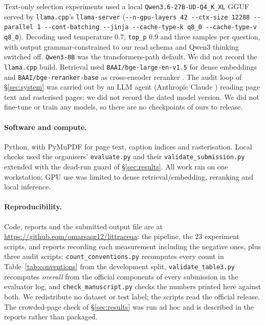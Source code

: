 \documentclass[11pt]{article}
\newcommand{\bk}{\allowbreak}
\begin{document}
Text-only selection experiments used a local
\texttt{Qwen3.6-\bk{}27B-\bk{}UD-\bk{}Q4\_\bk{}K\_\bk{}XL} GGUF served by \texttt{llama.cpp}'s
\texttt{llama-\bk{}server} (\texttt{-{}-n-\bk{}gpu-\bk{}layers 42 -{}-ctx-\bk{}size 12288
-{}-parallel 1 -{}-cont-\bk{}batching -{}-jinja -{}-cache-\bk{}type-\bk{}k q8\_0
-{}-cache-\bk{}type-\bk{}v q8\_0}). Decoding used temperature $0.7$, \texttt{top\_p} $0.9$
and three samples per question, with output grammar-constrained to our read
schema and Qwen3 thinking switched off. \texttt{Qwen3-8B} \citep{qwen3} was the
transformers-path default. We did not record the \texttt{llama.cpp} build.
Retrieval used \texttt{BAAI/\bk{}bge-\bk{}large-\bk{}en-\bk{}v1.5} for dense embeddings
\citep{bge-embed} and \texttt{BAAI/\bk{}bge-\bk{}reranker-\bk{}base} as cross-encoder reranker
\citep{bge-rerank}. The audit loop of \S\ref{sec:system} was carried out by an
LLM agent (Anthropic Claude \citep{claude-models}) reading page text and
rasterised pages; we did not record the dated model version. We did not fine-tune
or train any models, so there are no checkpoints of ours to release.

\paragraph{Software and compute.} Python, with PyMuPDF \citep{pymupdf} for page
text, caption indices and rasterisation. Local checks used the organisers'
\texttt{evaluate.py} and their \texttt{validate\_submission.py} extended with the
dead-run guard of \S\ref{sec:results}. All work ran on one workstation; GPU use
was limited to dense retrieval/embedding, reranking and local inference.

\paragraph{Reproducibility.} Code, reports and the submitted output file are at
\url{https://github.com/omarsaqr12/littraceqa}: the pipeline, the 23 experiment
scripts, and reports recording each measurement including the negative ones, plus
three audit scripts:
\texttt{count\_\bk{}conventions.py} recomputes every count in
Table~\ref{tab:conventions} from the development split,
\texttt{validate\_\bk{}table3.py} recomputes \emph{overall} from the official
components of every submission in the evaluator log, and
\texttt{check\_\bk{}manuscript.py} checks the numbers printed here against both. We
redistribute no dataset or test label; the scripts read the official release. The crowded-page check of
\S\ref{sec:results} was run ad hoc and is described in the reports rather than
packaged.
\end{document}
